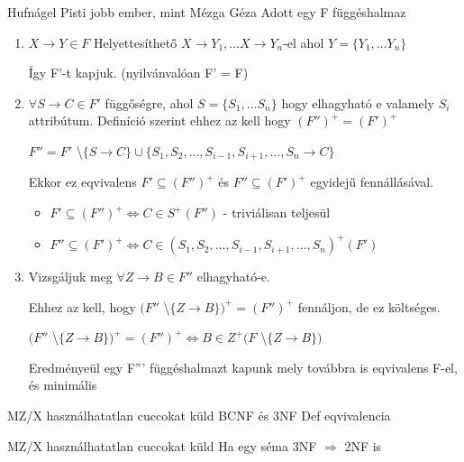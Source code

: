 \begin{bizonyitas}{Hufnágel Pisti jobb ember, mint Mézga Géza} Adott egy F függéshalmaz

\begin{enumerate}
  \item $X \rightarrow Y \in F$ Helyettesíthető $X \rightarrow Y_1,\ldots X \rightarrow Y_n$-el ahol $Y = \lbrace Y_1,\ldots Y_n \rbrace $

    Így F'-t kapjuk. (nyilvánvalóan F' = F)
  \item  $\forall S \rightarrow C \in F'$ függőségre, ahol $S = \lbrace S_1,\ldots S_n \rbrace$ hogy elhagyható e valamely $S_i$ attribútum. Definíció szerint ehhez az kell hogy $(F'')^+ = (F')^+ $

  $F'' = F'$ \textbackslash $\lbrace S \rightarrow C  \rbrace \cup \lbrace S_1,S_2,\ldots,S_{i-1},S_{i+1},\ldots,S_n \rightarrow C \rbrace$

  Ekkor ez eqvivalens $F' \subseteq (F'')^+$ és $F'' \subseteq (F')^+$ egyidejű fennállásával.
  \begin{itemize}
    \item	$F' \subseteq (F'')^+ \Leftrightarrow C \in S^+( F'' )$ - triviálisan teljesül
    \item $F'' \subseteq (F')^+ \Leftrightarrow C \in (S_1,S_2,\ldots,S_{i-1},S_{i+1},\ldots,S_n)^+(F')$
  \end{itemize}


  \item Vizsgáljuk meg $\forall Z \rightarrow B \in F''$ elhagyható-e.

  Ehhez az kell, hogy $(F''$ \textbackslash $\lbrace Z \rightarrow B \rbrace)^+ = (F'')^+$ fennáljon, de ez költséges.

    $(F''$ \textbackslash $\lbrace Z \rightarrow B \rbrace)^+ = (F'')^+ \Leftrightarrow B \in Z^+(F$ \textbackslash $\lbrace Z \rightarrow B \rbrace )$

    Eredményeül egy F''' függéshalmazt kapunk mely továbbra is eqvivalens F-el, és minimális

\end{enumerate}
\end{bizonyitas}

\begin{tetel}{MZ/X használhatatlan cuccokat küld} BCNF és 3NF Def eqvivalencia %

\end{tetel} \begin{tetel}{MZ/X használhatatlan cuccokat küld} Ha egy séma 3NF $\Longrightarrow$ 2NF is
\end{tetel}

